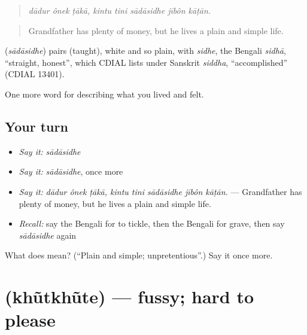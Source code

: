 \begin{quote}
\emph{dādur ônek ṭākā, kintu tini sādāsidhe jībôn kāṭān.}
\end{quote}

\begin{quote}
Grandfather has plenty of money, but he lives a plain and simple life.
\end{quote}

\begin{cousinweb}
\textbf{} (\emph{sādāsidhe}) pairs  (taught), white and so plain, with \emph{sidhe}, the Bengali \emph{sidhā}, \textquotedblleft{}straight, honest\textquotedblright{}, which CDIAL lists under Sanskrit \emph{siddha}, \textquotedblleft{}accomplished\textquotedblright{} (CDIAL 13401).
\end{cousinweb}

\begin{grammarlens}[title={What you've built}]
One more word for describing what you lived and felt.
\end{grammarlens}

\subsection*{Your turn}
\begin{itemize}
\raggedright
  \item \emph{Say it:} \emph{sādāsidhe}
  \item \emph{Say it:} \emph{sādāsidhe}, once more
  \item \emph{Say it:} \emph{dādur ônek ṭākā, kintu tini sādāsidhe jībôn kāṭān.} — Grandfather has plenty of money, but he lives a plain and simple life.
  \item \emph{Recall:} say the Bengali for to tickle, then the Bengali for grave, then say \emph{sādāsidhe} again
\end{itemize}

\begin{tcolorbox}[breakable,colback=teal!4,colframe=teal!35!black,title={Before you move on}]
What does  mean? (\textquotedblleft{}Plain and simple; unpretentious\textquotedblright{}.) Say it once more.
\end{tcolorbox}
\section[\texorpdfstring{\bn{খুঁতখুঁতে} (khũtkhũte)}{খুঁতখুঁতে (khũtkhũte)}]{ (khũtkhũte) — fussy; hard to please}

